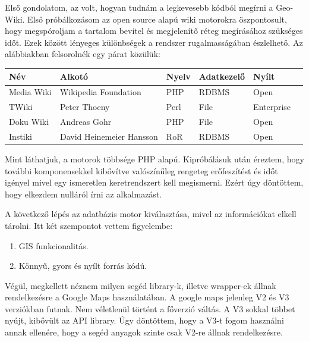 	Első gondolatom, az volt, hogyan tudnám a legkevesebb kódból megírni a Geo-Wiki. Első próbálkozásom az open source alapú wiki motorokra öszpontosult, hogy
	megspóroljam a tartalom bevitel és megjelenítő réteg megírásához szükséges időt.
	Ezek között lényeges különbségek a rendszer rugalmasságában észlelhető. Az alábbiakban felsorolnék egy párat közülük:
	\begin{center}
	    \begin{tabular}{ | l | l | l | l | l | p{5cm} |}
		\hline
	    \hline
	    Név & Alkotó & Nyelv & Adatkezelő  & Nyílt   \\ \hline
	    Media Wiki & Wikipedia Foundation & PHP & RDBMS & Open\\ \hline
	    TWiki & Peter Thoeny & Perl & File & Enterprise \\ \hline
	    Doku Wiki & Andreas Gohr & PHP &  File & Open\\ \hline
		Instiki &  David Heinemeier Hansson & RoR & RDBMS & Open \\ \hline
	    \hline
	    \end{tabular}
	\end{center}
	Mint láthatjuk, a motorok többsége PHP alapú. Kipróbálásuk után éreztem, hogy további komponensekkel kibővítve valószínűleg
	rengeteg erőfeszítést és időt igényel mivel egy ismeretlen keretrendszert kell megismerni. Ezért úgy döntöttem, hogy elkezdem nulláról írni az alkalmazást.
	
	A következő lépés az adatbázis motor kiválasztása, mivel az információkat elkell tárolni. Itt két szempontot vettem figyelembe:
	\begin{enumerate}
		\item GIS funkcionalitás.
		\item Könnyű, gyors és nyílt forrás kódú.
	\end{enumerate}
	
	Végül, megkellett néznem milyen segéd library-k, illetve wrapper-ek állnak rendelkezésre a Google Maps használatában.
	A google maps jelenleg V2 és V3 verziókban futnak. Nem véletlenül történt a főverzió váltás. A V3 sokkal többet nyújt, kibővült az API
	library. Úgy döntöttem, hogy a V3-t fogom használni annak ellenére, hogy a segéd anyagok szinte csak V2-re állnak rendelkezésre.

